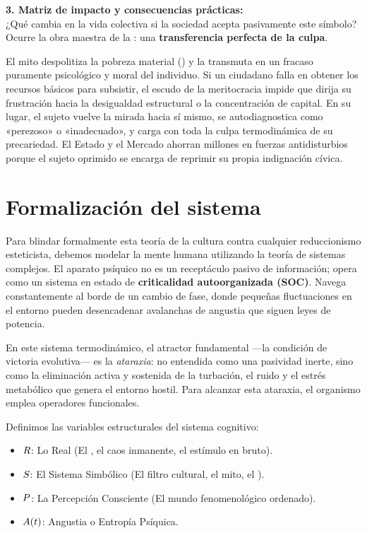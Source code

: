 \begin{argumento}
\textbf{3. Matriz de impacto y consecuencias prácticas:}\\
¿Qué cambia en la vida colectiva si la sociedad acepta pasivamente este símbolo? Ocurre la obra maestra de la \ViolenciaSimbolica: una \textbf{transferencia perfecta de la culpa}. 

El mito despolitiza la pobreza material (\HechosBrutos) y la transmuta en un fracaso puramente psicológico y moral del individuo. Si un ciudadano falla en obtener los recursos básicos para subsistir, el escudo de la meritocracia impide que dirija su frustración hacia la desigualdad estructural o la concentración de capital. En su lugar, el sujeto vuelve la mirada hacia sí mismo, se autodiagnostica como «perezoso» o «inadecuado», y carga con toda la culpa termodinámica de su precariedad. El Estado y el Mercado ahorran millones en fuerzas antidisturbios porque el sujeto oprimido se encarga de reprimir su propia indignación cívica.
\end{argumento}

\section{Formalización del sistema}
\label{sec:lab_termodinamica_psiquica}

Para blindar formalmente esta teoría de la cultura contra cualquier reduccionismo esteticista, debemos modelar la mente humana utilizando la teoría de sistemas complejos. El aparato psíquico no es un receptáculo pasivo de información; opera como un sistema en estado de \textbf{criticalidad autoorganizada (SOC)}. Navega constantemente al borde de un cambio de fase, donde pequeñas fluctuaciones en el entorno pueden desencadenar avalanchas de angustia que siguen leyes de potencia. 

En este sistema termodinámico, el atractor fundamental —la condición de victoria evolutiva— es la \textit{ataraxia}: no entendida como una pasividad inerte, sino como la eliminación activa y sostenida de la turbación, el ruido y el estrés metabólico que genera el entorno hostil. Para alcanzar esta ataraxia, el organismo emplea operadores funcionales.

Definimos las variables estructurales del sistema cognitivo:
\begin{itemize}
    \item $R$: Lo Real (El \AbsolutismoRealidad, el caos inmanente, el estímulo en bruto).
    \item $S$: El Sistema Simbólico (El filtro cultural, el mito, el \RegimenVerdad).
    \item $P$: La Percepción Consciente (El mundo fenomenológico ordenado).
    \item $A(t)$: Angustia o Entropía Psíquica.
\end{itemize}

